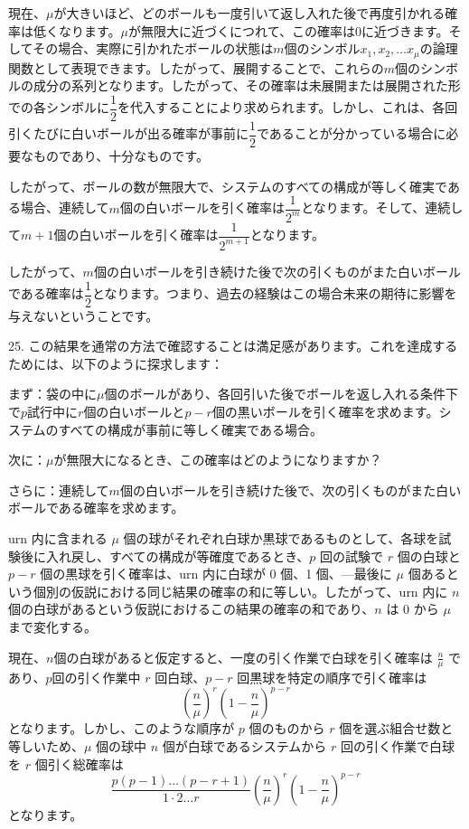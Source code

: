 \documentclass[a4paper,11pt,openany]{ltjsbook}
\begin{document}
現在、$\mu$が大きいほど、どのボールも一度引いて返し入れた後で再度引かれる確率は低くなります。$\mu$が無限大に近づくにつれて、この確率は0に近づきます。そしてその場合、実際に引かれたボールの状態は$m$個のシンボル$x_1, x_2, \dotsc x_\mu$の論理関数として表現できます。したがって、展開することで、これらの$m$個のシンボルの成分の系列となります。したがって、その確率は未展開または展開された形での各シンボルに$\dfrac{1}{2}$を代入することにより求められます。しかし、これは、各回引くたびに白いボールが出る確率が事前に$\dfrac{1}{2}$であることが分かっている場合に必要なものであり、十分なものです。

したがって、ボールの数が無限大で、システムのすべての構成が等しく確実である場合、連続して$m$個の白いボールを引く確率は$\dfrac{1}{2^m}$となります。そして、連続して$m + 1$個の白いボールを引く確率は$\dfrac{1}{2^{m+1}}$となります。

したがって、$m$個の白いボールを引き続けた後で次の引くものがまた白いボールである確率は$\dfrac{1}{2}$となります。つまり、過去の経験はこの場合未来の期待に影響を与えないということです。

25. この結果を通常の方法で確認することは満足感があります。これを達成するためには、以下のように探求します：

まず：袋の中に$\mu$個のボールがあり、各回引いた後でボールを返し入れる条件下で$p$試行中に$r$個の白いボールと$p-r$個の黒いボールを引く確率を求めます。システムのすべての構成が事前に等しく確実である場合。

次に：$\mu$が無限大になるとき、この確率はどのようになりますか？

さらに：連続して$m$個の白いボールを引き続けた後で、次の引くものがまた白いボールである確率を求めます。

urn 内に含まれる \(\mu\) 個の球がそれぞれ白球か黒球であるものとして、各球を試験後に入れ戻し、すべての構成が等確度であるとき、\(p\) 回の試験で \(r\) 個の白球と \(p-r\) 個の黒球を引く確率は、urn 内に白球が 0 個、1 個、---最後に \(\mu\) 個あるという個別の仮説における同じ結果の確率の和に等しい。したがって、urn 内に \(n\) 個の白球があるという仮説におけるこの結果の確率の和であり、\(n\) は 0 から \(\mu\) まで変化する。

現在、$n$個の白球があると仮定すると、一度の引く作業で白球を引く確率は $\frac{n}{\mu}$ であり、$p$回の引く作業中 $r$ 回白球、$p-r$ 回黒球を特定の順序で引く確率は
\[
  \left( \frac{n}{\mu} \right)^r
  \left( 1 - \frac{n}{\mu} \right)^{p-r}
\]
となります。しかし、このような順序が $p$ 個のものから $r$ 個を選ぶ組合せ数と等しいため、$\mu$ 個の球中 $n$ 個が白球であるシステムから $r$ 回の引く作業で白球を $r$ 個引く総確率は
\[
  \frac{ p(p-1) \dotsc (p-r+1) }{ 1 \cdot 2 \dotsc r }
  \left( \frac{n}{\mu} \right)^r
  \left( 1 - \frac{n}{\mu} \right)^{p-r} \tag{1}
\]
となります。
\end{document}
